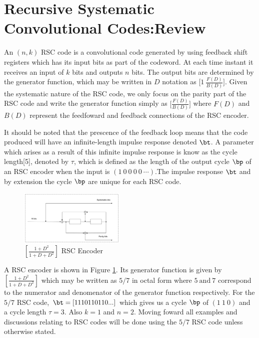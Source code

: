 \section{Recursive Systematic Convolutional Codes:Review}
\label{sec2}

An $(n,k)$ RSC code is a convolutional code generated by using feedback shift registers which has its input bits as part of the codeword. At each time instant it receives an input of $k$ bits and outputs $n$ bits. The output bits are determined by the generator function, which may be written in $D$ notation as  $\Big[1 ~\frac{F(D)}{B(D)}\Big]$. Given the systematic nature of the RSC code, we only focus on the parity part of the RSC code and write the generator function simply as $\Big[\frac{F(D)}{B(D)}\Big]$ where $F(D)$ and $B(D)$ represent the feedfoward and feedback connections of the RSC encoder.  

It should be noted that the prescence of the feedback loop means that the code produced will have an infinite-length impulse response denoted $\bt$. A parameter which arises as a result of this infinite impulse response is know as the cycle length[5], denoted by $\tau$, which is defined as the length of the output cycle $\bp$ of an RSC encoder when the input is $(1~0~0~0~0~\cdots)$.The impulse response $\bt$ and by extension the cycle $\bp$ are unique for each RSC code. 

\begin{figure}[h]
\centering
		\includegraphics[width=0.45\textwidth]{RSCExample3.pdf}
		\caption{$[\frac{1+D^2}{1+D+D^2}]$  RSC Encoder}
		\label{fig1}
		\end{figure}
		
A RSC encoder is shown in Figure \ref{fig1}. Its generator function is given by $[\frac{1+D^2}{1+D+D^2}]$ which may be written as $5/7$ in octal form where $5 ~ \text{and} ~ 7$ correspond to the numerator and denomenator of the generator function respectively. 
 For the $5/7$ RSC code, $\bt=[1 1 1 0 1 1 0 1 1 0 ...]$ which gives us a cycle $\bp$ of $(1~1~0)$ and a cycle length $\tau =3$. 
 Also $k=1$ and $n=2$. Moving foward all examples and discussions relating to RSC codes will be done using the $5/7$ RSC code unless otherwise stated.
